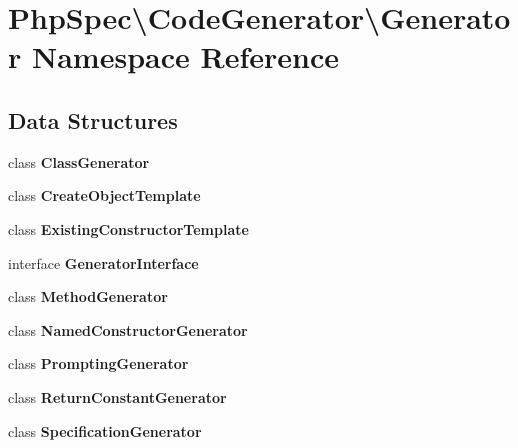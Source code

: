 \section{Php\+Spec\textbackslash{}Code\+Generator\textbackslash{}Generator Namespace Reference}
\label{namespace_php_spec_1_1_code_generator_1_1_generator}
\subsection*{Data Structures}
\begin{DoxyCompactItemize}
\item 
class {\bf Class\+Generator}
\item 
class {\bf Create\+Object\+Template}
\item 
class {\bf Existing\+Constructor\+Template}
\item 
interface {\bf Generator\+Interface}
\item 
class {\bf Method\+Generator}
\item 
class {\bf Named\+Constructor\+Generator}
\item 
class {\bf Prompting\+Generator}
\item 
class {\bf Return\+Constant\+Generator}
\item 
class {\bf Specification\+Generator}
\end{DoxyCompactItemize}
